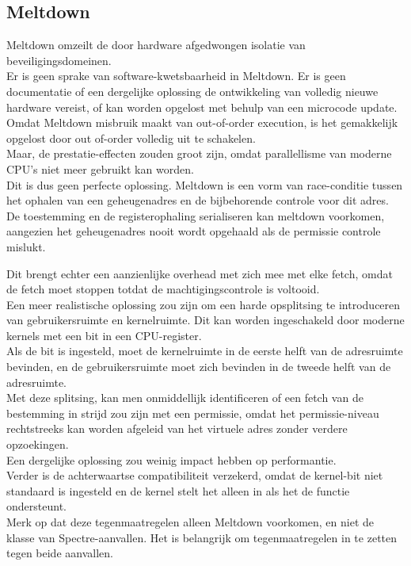 \subsection{Meltdown}
Meltdown omzeilt de door hardware afgedwongen isolatie van
beveiligingsdomeinen.\\ Er is geen sprake van software-kwetsbaarheid
in Meltdown. Er is geen documentatie
of een dergelijke oplossing de ontwikkeling van volledig
nieuwe hardware vereist, of kan worden opgelost met behulp van een microcode
update.\\
Omdat Meltdown misbruik maakt van out-of-order execution, is het gemakkelijk opgelost
door out of-order volledig uit te schakelen.\\ Maar, de prestatie-effecten
zouden groot zijn, omdat parallellisme van moderne CPU's
niet meer gebruikt kan worden.\\ Dit is dus geen perfecte
oplossing.
Meltdown is een vorm van race-conditie tussen het
ophalen van een geheugenadres en de bijbehorende controle voor dit adres. De toestemming en de registerophaling serialiseren
 kan meltdown voorkomen,
aangezien het geheugenadres nooit wordt opgehaald als de permissie
controle mislukt.

Dit brengt echter een aanzienlijke overhead met zich mee
met elke fetch, omdat de fetch moet stoppen
totdat de machtigingscontrole is voltooid.\\
Een meer realistische oplossing zou zijn om een ​harde opsplitsing te introduceren
van gebruikersruimte en kernelruimte. Dit kan worden ingeschakeld door moderne kernels met een
bit in een CPU-register.\\ Als de
bit is ingesteld, moet de kernelruimte in de eerste helft 
van de adresruimte bevinden, en de gebruikersruimte moet zich bevinden in 
de tweede helft van de adresruimte.\\ Met deze splitsing, kan men onmiddellijk identificeren of een
fetch van de bestemming in strijd zou zijn met een permissie,
omdat het permissie-niveau rechtstreeks kan worden afgeleid van
het virtuele adres zonder verdere opzoekingen.\\ Een dergelijke oplossing zou weinig impact hebben op performantie.\\ Verder is de achterwaartse compatibiliteit
verzekerd, omdat de kernel-bit niet standaard is ingesteld en
de kernel stelt het alleen in als het de functie ondersteunt.\\
Merk op dat deze tegenmaatregelen alleen Meltdown voorkomen,
en niet de klasse van Spectre-aanvallen. 
Het is belangrijk om tegenmaatregelen in te zetten
tegen beide aanvallen.




